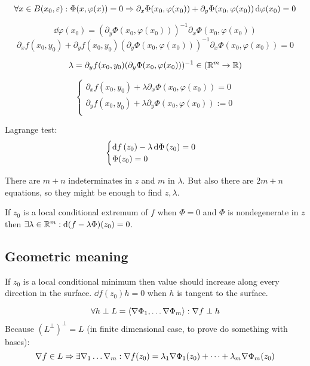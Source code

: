 \[ \forall x \in B(x_0, \varepsilon): \Phi(x, \varphi(x)) = 0 \Rightarrow \partial_x \Phi(x_0, \varphi(x_0)) + \partial_y \Phi(x_0, \varphi(x_0)) \dd{\varphi(x_0)} = 0 \] 

\[ \dd{\varphi(x_0)} = (\partial_y \Phi(x_0, \varphi(x_0)))^{-1} \partial_x \Phi(x_0, \varphi(x_0)) \] 
\[  \partial_x f(x_0, y_0) + \partial_y f(x_0, y_0)  (\partial_y \Phi(x_0, \varphi(x_0)))^{-1} \partial_x \Phi(x_0, \varphi(x_0)) = 0  \]

\[ \lambda = \partial_y f(x_0, y_0)  (\partial_y \Phi(x_0, \varphi(x_0)))^{-1} \in (\mathbb R^m \to \mathbb R)\] 

\[ \begin{cases}
    \partial_x f(x_0, y_0) + \lambda \partial_x \Phi(x_0, \varphi(x_0)) = 0\\ 
    \partial_y f(x_0, y_0) + \lambda \partial_y \Phi(x_0, \varphi(x_0)) := 0\\
\end{cases} \]

Lagrange test:
\[ \begin{cases}
    \dd{f}\/(z_0) - \lambda \dd{\Phi}\/(z_0) = 0\\
    \Phi(z_0) = 0\\
\end{cases} \]

There are $m + n$ indeterminates in $z$ and $m$ in $\lambda$. But also there are $2m + n$ equations, so 
they might be enough to find $z, \lambda$.

\begin{thr} If $z_0$ is a local conditional extremum of $f$ when $\Phi = 0$ and $\Phi$ is nondegenerate in $z$ then 
    $\exists \lambda \in \mathbb R^m: \dd{(f - \lambda \Phi)(z_0)} = 0 $.
\end{thr}

\subsection*{Geometric meaning}
If $z_0$ is a local conditional minimum then value should increase along every direction in the surface.
$ \dd{f(z_0)} h = 0 $ when $h$ is tangent to the surface.

\[ \forall h \perp L = \langle \nabla \Phi_1, \dots \nabla \Phi_m \rangle: \nabla f \perp h \] 
Because $(L^\perp)^\perp = L$ (in finite dimensional case, to prove do something with bases):
\[ \nabla f \in L \Rightarrow \exists \nabla_1 \dots \nabla_m: \nabla f(z_0) = \lambda_1 \nabla \Phi_1(z_0) + \dots + \lambda_m \nabla \Phi_m(z_0) \]

